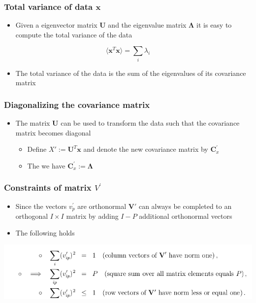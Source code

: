\documentclass[11pt]{article}
\begin{document}
\subsubsection{Total variance of data \(\pmb x\)}
\label{sec:org78b0496}
\begin{itemize}
\item Given a eigenvector matrix \(\pmb U\) and the eigenvalue matrix \(\pmb \Lambda\) it is easy to compute the total variance of the data
\end{itemize}
\begin{equation}
  \langle \pmb x^T \pmb x \rangle = \sum_i \lambda_i 
\end{equation}
\begin{itemize}
\item The total variance of the data is the sum of the eigenvalues of its covariance matrix
\end{itemize}

\subsubsection{Diagonalizing the covariance matrix}
\label{sec:org15d0178}
\begin{itemize}
\item The matrix \(\pmb U\) can be used to transform the data such that the covariance matrix becomes diagonal 
\begin{itemize}
\item Define \(X' := \pmb U^T \pmb x\) and denote the new covariance matrix by \(\pmb C_x^'\)
\item The we have \(\pmb C_x^{'} := \pmb \Lambda\)
\end{itemize}
\end{itemize}

\subsubsection{Constraints of matrix \(V^'\)}
\label{sec:org7b07490}
\begin{itemize}
\item Since the vectors \(v_p^'\) are orthonormal \(\pmb V'\) can always be completed to an orthogonal \(I \times I\) matrix by adding \(I-P\) additional orthonormal vectors
\item The following holds
\end{itemize}
\begin{center}
\includegraphics[width=.9\linewidth]{Principal Component Analysis/screenshot_2018-11-20_22-17-24.png}
\end{center}
\end{document}
